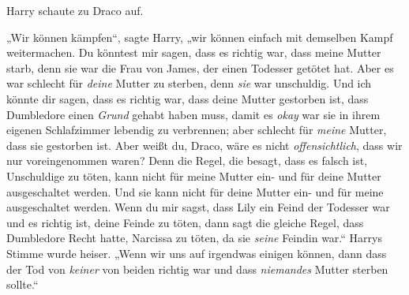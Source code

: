 Harry schaute zu Draco auf.

„Wir können kämpfen“, sagte Harry, „wir können einfach mit demselben Kampf weitermachen. Du könntest mir sagen, dass es richtig war, dass meine Mutter starb, denn sie war die Frau von James, der einen Todesser getötet hat. Aber es war schlecht für \emph{deine} Mutter zu sterben, denn \emph{sie} war unschuldig. Und ich könnte dir sagen, dass es richtig war, dass deine Mutter gestorben ist, dass Dumbledore einen \emph{Grund} gehabt haben muss, damit es \emph{okay} war sie in ihrem eigenen Schlafzimmer lebendig zu verbrennen; aber schlecht für \emph{meine} Mutter, dass sie gestorben ist. Aber weißt du, Draco, wäre es nicht \emph{offensichtlich}, dass wir nur voreingenommen waren? Denn die Regel, die besagt, dass es falsch ist, Unschuldige zu töten, kann nicht für meine Mutter ein- und für deine Mutter ausgeschaltet werden. Und sie kann nicht für deine Mutter ein- und für meine ausgeschaltet werden. Wenn du mir sagst, dass Lily ein Feind der Todesser war und es richtig ist, deine Feinde zu töten, dann sagt die gleiche Regel, dass Dumbledore Recht hatte, Narcissa zu töten, da sie \emph{seine} Feindin war.“ Harrys Stimme wurde heiser. „Wenn wir uns auf irgendwas einigen können, dann dass der Tod von \emph{keiner} von beiden richtig war und dass \emph{niemandes} Mutter sterben sollte.“

\later

